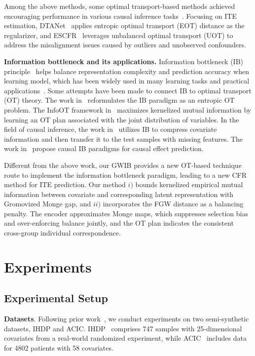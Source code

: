 \documentclass{article}
\begin{document}
Among the above methods, some optimal transport-based methods achieved encouraging performance in various causal inference tasks~\cite{charpentier2023optimal,li2021causal,dunipace2021optimal,torous2021optimal}.
Focusing on ITE estimation, DTANet~\cite{li2022deep} applies entropic optimal transport (EOT) distance as the regularizer, and ESCFR~\cite{wang2023optimal} leverages unbalanced optimal transport (UOT) to address the misalignment issues caused by outliers and unobserved confounders. 


\textbf{Information bottleneck and its applications.}
Information bottleneck (IB) principle~\cite{tishby1999information} helps balance representation complexity and prediction accuracy when learning model, which has been widely used in many learning tasks and practical applications~\cite{harremoes2007information,ozair2019wasserstein}. 
Some attempts have been made to connect IB to optimal transport (OT) theory. 
The work in~\cite{chen2023information} reformulates the IB paradigm as an entropic OT problem. 
The InfoOT framework in~\cite{chuang2023infoot} maximizes kernelized mutual information by learning an OT plan associated with the joint distribution of variables.
In the field of causal inference, the work in~\cite{parbhoo2020information} utilizes IB to compress covariate information and then transfer it to the test samples with missing features.
The work in~\cite{kim2019reliable,lu2022causal} propose causal IB paradigms for causal effect prediction.


Different from the above work, our GWIB provides a new OT-based technique route to implement the information bottleneck paradigm, leading to a new CFR method for ITE prediction.
Our method $i)$ bounds kernelized empirical mutual information between covariate and corresponding latent representation with Gromovized Monge gap, and
$ii)$ incorporates the FGW distance as a balancing penalty.
The encoder approximates Monge maps, which suppresses selection bias and over-enforcing balance jointly, and the OT plan indicates the consistent cross-group individual correspondence. 



\section{Experiments}





\subsection{Experimental Setup}
\label{sec:exp-set}
\textbf{Datasets}.
Following prior work~\cite{wang2023optimal}, we conduct experiments on two semi-synthetic datasets, IHDP and ACIC.  
IHDP~\cite{hill2011bayesian} comprises 747 samples with 25-dimensional covariates from a real-world randomized experiment, while ACIC~\cite{dorie2019automated} includes data for 4802 patients with 58 covariates.
\end{document}
